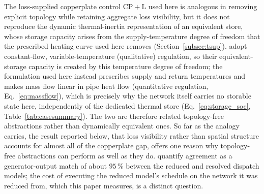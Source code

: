 \documentclass[a4paper,fleqn]{cas-sc}
\newcommand{\CPL}{\ensuremath{\mathrm{CP{+}L}}}
\providecommand{\DIFadd}[1]{{\protect\color[HTML]{1A5FB4} #1}} %
\begin{document}
\DIFadd{The loss-supplied
copperplate control $\CPL$ used here is analogous in removing explicit topology while
retaining aggregate loss visibility, but it does not reproduce the dynamic thermal-inertia
representation of an equivalent store, whose storage capacity arises from the
supply-temperature degree of freedom that the prescribed heating curve used here removes
(Section~\ref{subsec:tsup}). }\citet{Yang2024_equivalent} \DIFadd{adopt constant-flow,
variable-temperature (qualitative) regulation, so their equivalent-storage capacity is
created by this temperature degree of freedom; the formulation used here instead prescribes
supply and return temperatures and makes mass flow linear in pipe heat flow (quantitative
regulation, Eq.~\eqref{eq:massflow}), which is precisely why the network itself carries no
storable state here, independently of the dedicated thermal store
(Eq.~\eqref{eq:storage_soc}, Table~\ref{tab:casesummary}).
The two are therefore related topology-free abstractions rather than dynamically equivalent
ones. So far as the analogy carries, the result reported below,
that loss visibility rather than spatial structure accounts for almost all of the copperplate
gap, offers one reason why topology-free abstractions can perform as well as they do.
}\citet{Yang2024_equivalent} \DIFadd{quantify agreement as a generator-output match of about
$95$\,\% between the reduced and resolved dispatch models; the cost of executing the
reduced model's schedule on the network it was reduced from, which this paper measures, is a
distinct question.
}
\end{document}
